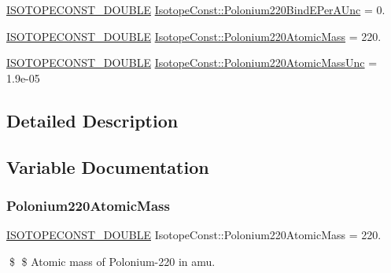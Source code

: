 \begin{DoxyCompactItemize}
\mbox{\hyperlink{group___isotope_const-_macros_ga8f45a7272ce02c0b4c65c44636ed719a}{I\+S\+O\+T\+O\+P\+E\+C\+O\+N\+S\+T\+\_\+\+D\+O\+U\+B\+LE}} \mbox{\hyperlink{group___isotope_const-_polonium-_po220_gae7a7790770948f25602a9533c906e851}{Isotope\+Const\+::\+Polonium220\+Bind\+E\+Per\+A\+Unc}} = 0.
\item 
\mbox{\hyperlink{group___isotope_const-_macros_ga8f45a7272ce02c0b4c65c44636ed719a}{I\+S\+O\+T\+O\+P\+E\+C\+O\+N\+S\+T\+\_\+\+D\+O\+U\+B\+LE}} \mbox{\hyperlink{group___isotope_const-_polonium-_po220_ga7c7be75a19cde7e2f5feedcf4c26e472}{Isotope\+Const\+::\+Polonium220\+Atomic\+Mass}} = 220.
\item 
\mbox{\hyperlink{group___isotope_const-_macros_ga8f45a7272ce02c0b4c65c44636ed719a}{I\+S\+O\+T\+O\+P\+E\+C\+O\+N\+S\+T\+\_\+\+D\+O\+U\+B\+LE}} \mbox{\hyperlink{group___isotope_const-_polonium-_po220_gad487495fc5a0ae2ad2930441c3eb03c7}{Isotope\+Const\+::\+Polonium220\+Atomic\+Mass\+Unc}} = 1.\+9e-\/05
\end{DoxyCompactItemize}


\subsection{Detailed Description}


\subsection{Variable Documentation}
\mbox{\label{group___isotope_const-_polonium-_po220_ga7c7be75a19cde7e2f5feedcf4c26e472}} 
\subsubsection{\texorpdfstring{Polonium220\+Atomic\+Mass}{Polonium220AtomicMass}}
{\footnotesize\ttfamily \mbox{\hyperlink{group___isotope_const-_macros_ga8f45a7272ce02c0b4c65c44636ed719a}{I\+S\+O\+T\+O\+P\+E\+C\+O\+N\+S\+T\+\_\+\+D\+O\+U\+B\+LE}} Isotope\+Const\+::\+Polonium220\+Atomic\+Mass = 220.}

\$ \$ Atomic mass of Polonium-\/220 in amu. \mbox{\label{group___isotope_const-_polonium-_po220_gad487495fc5a0ae2ad2930441c3eb03c7}} 
